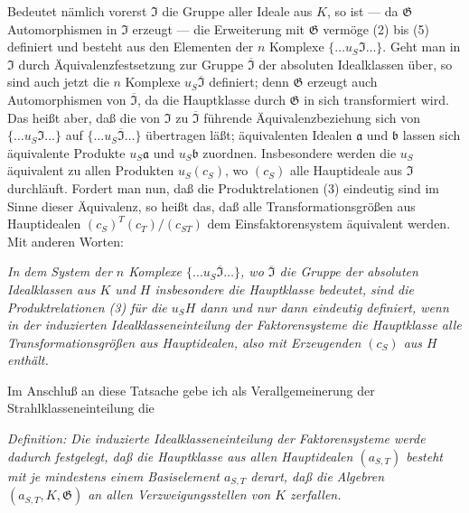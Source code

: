 Bedeutet nämlich vorerst \(\mathfrak I\) die Gruppe aller Ideale aus \(K\), so ist --- da \(\mathfrak G\) Automorphismen in \(\mathfrak I\) erzeugt --- die Erweiterung mit \(\mathfrak G\) vermöge (2) bis (5) definiert und besteht aus den Elementen der \(n\) Komplexe \(\{\ldots u_S\mathfrak I\ldots\}\). Geht man in \(\mathfrak I\) durch Äquivalenzfestsetzung zur Gruppe \(\overline{\mathfrak I}\) der absoluten Idealklassen über, so sind auch jetzt die \(n\) Komplexe \(u_S\overline{\mathfrak I}\) definiert; denn \(\mathfrak G\) erzeugt auch Automorphismen von \(\overline{\mathfrak I}\), da die Hauptklasse durch \(\mathfrak G\) in sich transformiert wird. Das heißt aber, daß die von \(\mathfrak I\) zu \(\overline{\mathfrak I}\) führende Äquivalenzbeziehung sich von \(\{\ldots u_S\mathfrak I\ldots\}\) auf \(\{\ldots u_S\overline{\mathfrak I}\ldots\}\) übertragen läßt; äquivalenten Idealen \(\mathfrak a\) und \(\mathfrak b\) lassen sich äquivalente Produkte \(u_S\mathfrak a\) und \(u_S\mathfrak b\) zuordnen. Insbesondere werden die \(u_S\) äquivalent zu allen Produkten \(u_S(c_S)\), wo \((c_S)\) alle Hauptideale aus \(\mathfrak I\) durchläuft. Fordert man nun, daß die Produktrelationen (3) eindeutig sind im Sinne dieser Äquivalenz, so heißt das, daß alle Transformationsgrößen aus Hauptidealen \((c_S)^T(c_T)/(c_{ST})\) dem Einsfaktorensystem äquivalent werden. Mit anderen Worten:

\emph{In dem System der \(n\) Komplexe \(\{\ldots u_S\overline{\mathfrak I}\ldots\}\), wo \(\overline{\mathfrak I}\) die Gruppe der absoluten Idealklassen aus \(K\) und \(H\) insbesondere die Hauptklasse bedeutet, sind die Produktrelationen (3) für die \(u_SH\) dann und nur dann eindeutig definiert, wenn in der induzierten Idealklasseneinteilung der Faktorensysteme die Hauptklasse alle Transformationsgrößen aus Hauptidealen, also mit Erzeugenden \((c_S)\) aus \(H\) enthält.}

Im Anschluß an diese Tatsache gebe ich als Verallgemeinerung der Strahlklasseneinteilung die

\emph{Definition: Die induzierte Idealklasseneinteilung der Faktorensysteme werde dadurch festgelegt, daß die Hauptklasse aus allen Hauptidealen \((a_{S,T})\) besteht mit je mindestens einem Basiselement \(a_{S,T}\) derart, daß die Algebren \((a_{S,T},K,\mathfrak G)\) an allen Verzweigungsstellen von \(K\) zerfallen.}

